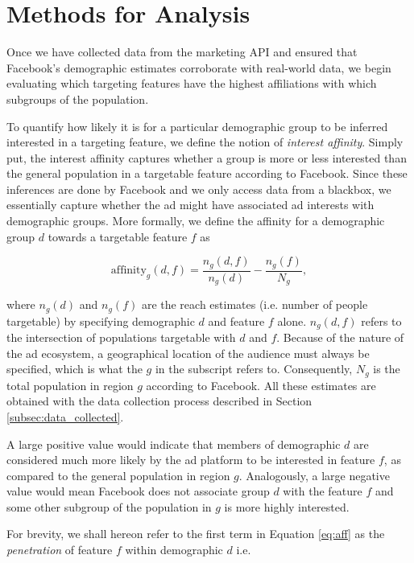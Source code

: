 \section{Methods for Analysis} \label{sec:methods}
Once we have collected data from the marketing API and ensured that Facebook's demographic estimates corroborate with real-world data, we begin evaluating which targeting features have the highest affiliations with which subgroups of the population.


To quantify how likely it is for a particular demographic group to be inferred interested in a targeting feature, we define the notion of \textit{interest affinity}. Simply put, the interest affinity captures whether a group is more or less interested than the general population in a targetable feature according to Facebook. Since these inferences are done by Facebook and we only access data from a blackbox, we essentially capture whether the ad might have associated ad interests with demographic groups. More formally, we define the affinity for a demographic group $d$ towards a targetable feature $f$ as

\begin{equation}
\text{affinity}_g(d, f) = \frac{n_g(d, f)}{n_g(d)} - \frac{n_g(f)}{N_g},
\label{eq:aff}
\end{equation}

where $n_g(d)$ and $n_g(f)$ are the reach estimates (i.e. number of people targetable) by specifying demographic $d$ and feature $f$ alone. $n_g(d, f)$ refers to the intersection of populations targetable with $d$ and $f$. Because of the nature of the ad ecosystem, a geographical location of the audience must always be specified, which is what the $g$ in the subscript refers to. Consequently, $N_g$ is the total population in region $g$ according to Facebook. All these estimates are obtained with the data collection process described in Section \ref{subsec:data_collected}.

A large positive value would indicate that members of demographic $d$ are considered much more likely by the ad platform to be interested in feature $f$, as compared to the general population in region $g$. Analogously, a large negative value would mean Facebook does not associate group $d$ with the feature $f$ and some other subgroup of the population in $g$ is more highly interested.

For brevity, we shall hereon refer to the first term in Equation \ref{eq:aff} as the \textit{penetration} of feature $f$ within demographic $d$ i.e.

